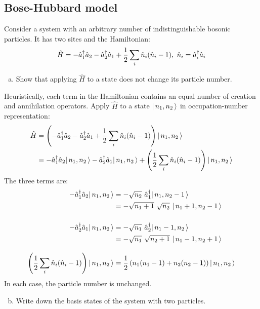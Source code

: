 \newcommand{\opc}[1]{\hat{a}^{\dagger}_{#1}}
\newcommand{\opa}[1]{\hat{a}_{#1}}
\newcommand{\opn}[1]{\hat{n}_{#1}}

\subsection{Bose-Hubbard model}

Consider a system with an arbitrary number of indistinguishable bosonic
particles.
It has two sites and the Hamiltonian:
\begin{equation}
  \hat{H} = - \opc{1}\opa{2} - \opc{2}\opa{1} + \half \sum_i \opn{i}(\opn{i} - 1)
  ,\
  \opn{i} = \opc{i}\opa{i}
\end{equation}

\begin{enumerate}[(a)]
  \setcounter{enumi}{0}
  \item Show that applying $\hat{H}$ to a state does not change its particle
        number.
\end{enumerate}

Heuristically, each term in the Hamiltonian contains an equal number of
creation and annihilation operators.
Apply $\hat{H}$ to a state $\lvert\,n_1, n_2\,\rangle$ in occupation-number representation:
\begin{align*}
  \hat{H}
   & = \left(
  - \opc{1}\opa{2}
  - \opc{2}\opa{1}
  + \half \sum_i \opn{i}(\opn{i} - 1)
  \right) \ket{n_1, n_2}
  \\
   & =
  - \opc{1}\opa{2}\ket{n_1, n_2}
  - \opc{2}\opa{1}\ket{n_1, n_2}
  + \left( \half \sum_i \opn{i}(\opn{i} - 1) \right) \ket{n_1, n_2}
\end{align*}
The three terms are:
\begin{align*}
  - \opc{1}\opa{2}\ket{n_1, n_2}
   & =
  - \sqrt{n_2}\ \opc{1}\ket{n_1, n_2 - 1}
  \\
   & =
  - \sqrt{n_1 + 1}\ \sqrt{n_2}\ \ket{n_1 + 1, n_2 - 1}
  \\[3ex]
  - \opc{2}\opa{1}\ket{n_1, n_2}
   & =
  - \sqrt{n_1}\ \opc{2}\ket{n_1 - 1, n_2}
  \\
   & =
  - \sqrt{n_1}\ \sqrt{n_2 + 1}\ \ket{n_1 - 1, n_2 + 1}
  \\[2ex]
  \left( \half \sum_i \opn{i}(\opn{i} - 1) \right) \ket{n_1, n_2}
   & =
  \half \left( n_1(n_1 - 1) + n_2(n_2 - 1) \right) \ket{n_1, n_2}
\end{align*}
In each case, the particle number is unchanged.

\begin{enumerate}[(a)]
  \setcounter{enumi}{1}
  \item Write down the basis states of the system with two particles.
\end{enumerate}

